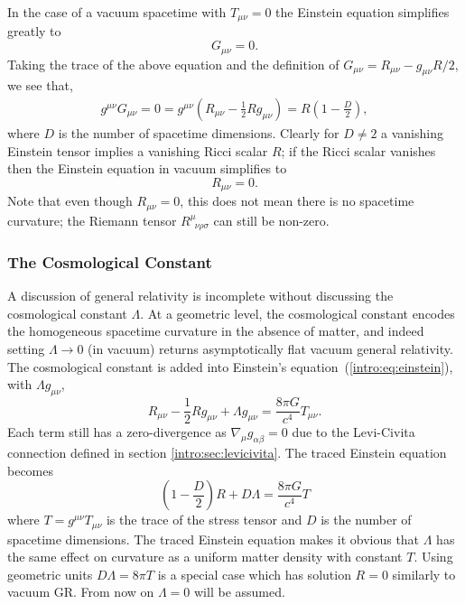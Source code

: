 In the case of a vacuum spacetime with $T_{\mu\nu}=0$ the Einstein equation simplifies greatly to
\begin{equation}G_{\mu\nu}=0.\end{equation}
Taking the trace of the above equation and the definition of $G_{\mu\nu}=R_{\mu\nu}-g_{\mu\nu}R/2$, we see that,
\begin{align}
g^{\mu\nu}G_{\mu\nu}=0=g^{\mu\nu}\left(R_{\mu\nu}-\frac{1}{2}Rg_{\mu\nu}\right) = R\left(1-\frac{D}{2}\right),
\end{align}
where $D$ is the number of spacetime dimensions. Clearly for $D\neq 2$ a vanishing Einstein tensor implies a vanishing Ricci scalar $R$; if the Ricci scalar vanishes then the Einstein equation in vacuum simplifies to
\begin{equation}
R_{\mu\nu} = 0.
\end{equation}
Note that even though $R_{\mu\nu}=0$, this does not mean there is no spacetime curvature; the Riemann tensor $R^\mu_{\,\,\,\nu\rho\sigma}$ can still be non-zero.


\subsubsection{The Cosmological Constant} \label{intro:sec:cosmology}
A discussion of general relativity is incomplete without discussing the cosmological constant $\Lambda$. At a geometric level, the cosmological constant encodes the homogeneous spacetime curvature in the absence of matter, and indeed setting $\Lambda\rightarrow 0$ (in vacuum) returns asymptotically flat vacuum general relativity. The cosmological constant is added into Einstein's equation~(\ref{intro:eq:einstein}), with $\Lambda g_{\mu\nu}$,
\begin{equation} \label{intro:eq:einsteinlambda}
R_{\mu\nu}-\frac{1}{2}Rg_{\mu\nu}  +  \Lambda g_{\mu\nu} = \frac{8 \pi G}{c^4}T_{\mu\nu}.
\end{equation}
Each term still has a zero-divergence as $\nabla_\mu g_{\alpha\beta}=0$ due to the Levi-Civita connection defined in section \ref{intro:sec:levicivita}. The traced Einstein equation becomes
\begin{equation}
\left(1- \frac{D}{2}\right)R + D\Lambda = \frac{8\pi G}{c^4}T
\end{equation}
where $T=g^{\mu\nu}T_{\mu\nu}$ is the trace of the stress tensor and $D$ is the number of spacetime dimensions. The traced Einstein equation makes it obvious that $\Lambda$ has the same effect on curvature as a uniform matter density with constant $T$. Using geometric units $D\Lambda = 8\pi T$ is a special case which has solution $R=0$ similarly to vacuum GR. From now on $\Lambda=0$ will be assumed.






